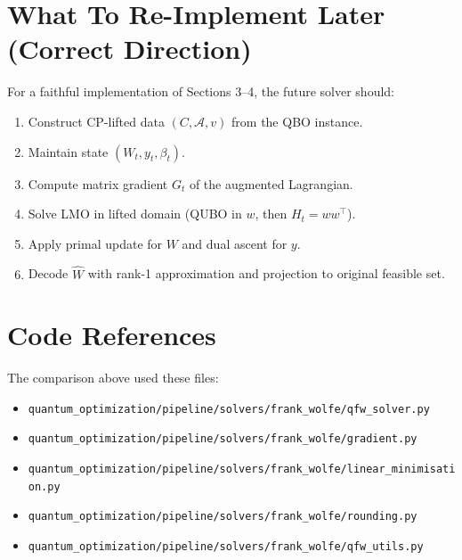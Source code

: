 \documentclass[11pt]{article}
\begin{document}
\section{What To Re-Implement Later (Correct Direction)}
For a faithful implementation of Sections 3--4, the future solver should:
\begin{enumerate}
\item Construct CP-lifted data $(C, \mathcal{A}, v)$ from the QBO instance.
\item Maintain state $(W_t, y_t, \beta_t)$.
\item Compute matrix gradient $G_t$ of the augmented Lagrangian.
\item Solve LMO in lifted domain (QUBO in $w$, then $H_t=w w^\top$).
\item Apply primal update for $W$ and dual ascent for $y$.
\item Decode $\hat W$ with rank-1 approximation and projection to original feasible set.
\end{enumerate}

\section{Code References}
The comparison above used these files:
\begin{itemize}
\item \texttt{quantum\_optimization/pipeline/solvers/frank\_wolfe/qfw\_solver.py}
\item \texttt{quantum\_optimization/pipeline/solvers/frank\_wolfe/gradient.py}
\item \texttt{quantum\_optimization/pipeline/solvers/frank\_wolfe/linear\_minimisation.py}
\item \texttt{quantum\_optimization/pipeline/solvers/frank\_wolfe/rounding.py}
\item \texttt{quantum\_optimization/pipeline/solvers/frank\_wolfe/qfw\_utils.py}
\end{itemize}
\end{document}
